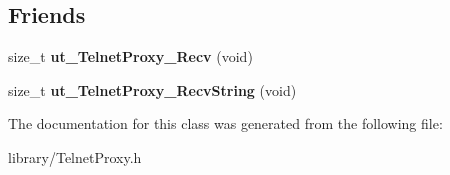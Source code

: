 \subsection*{Friends}
\begin{DoxyCompactItemize}
\item 
\hypertarget{class_telnet_proxy_a436d76cf48d888700dddd5dc72c7bc56}{size\-\_\-t {\bfseries ut\-\_\-\-Telnet\-Proxy\-\_\-\-Recv} (void)}\label{class_telnet_proxy_a436d76cf48d888700dddd5dc72c7bc56}

\item 
\hypertarget{class_telnet_proxy_a899fd61cba9dec179f6a058b25c73cb7}{size\-\_\-t {\bfseries ut\-\_\-\-Telnet\-Proxy\-\_\-\-Recv\-String} (void)}\label{class_telnet_proxy_a899fd61cba9dec179f6a058b25c73cb7}

\end{DoxyCompactItemize}


The documentation for this class was generated from the following file\-:\begin{DoxyCompactItemize}
\item 
library/Telnet\-Proxy.\-h\end{DoxyCompactItemize}
